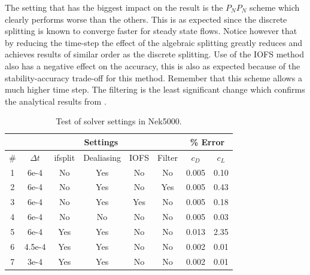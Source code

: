The setting that has the biggest impact on the result is the $P_NP_N$ scheme which clearly performs 
worse than the others. This is as expected since the discrete splitting is known to converge faster
for steady state flows. Notice however that by reducing the time-step the effect of the algebraic splitting
greatly reduces and achieves results of similar order as the discrete splitting.
Use of the IOFS method also has a negative effect on the accuracy,
this is also as expected because of the stability-accuracy trade-off for this method.
Remember that this scheme allows a much higher time step. The filtering is the least significant change
which confirms the analytical results from . 
%
\begin{table}[h]
    \centering
    \begin{tabular}{c | c c c c c | c c }
         & \multicolumn{5}{|c|}{Settings} & \multicolumn{2}{|c}{\% Error} \\\hline
         \# & $\Delta t$ & ifsplit & Dealiasing & IOFS & Filter & $c_D$ & $c_L$ \\  \hline 
         1 & 6e-4& No & Yes& No & No & 0.005 & 0.10\\
         2 & 6e-4& No & Yes& No & Yes& 0.005 & 0.43\\
         3 & 6e-4& No & Yes& Yes& No & 0.005 & 0.18\\
         4 & 6e-4& No & No & No & No & 0.005 & 0.03\\
         5 & 6e-4& Yes& Yes& No & No & 0.013 & 2.35\\
         6 & 4.5e-4& Yes& Yes& No & No & 0.002 & 0.01\\
         7 & 3e-4& Yes& Yes& No & No & 0.002 & 0.01\\
    \end{tabular}
    \caption{Test of solver settings in Nek5000.}
    \label{tab:perf}
\end{table}
%

